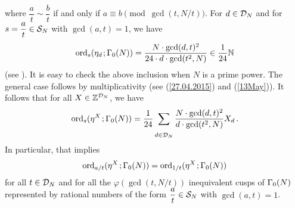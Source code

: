 \documentclass[a4paper,11pt]{amsart}
\begin{document}
where $\dfrac{a}{t}\sim\dfrac{b}{t}$ if and only if $a\equiv b\pmod{\gcd(t,N/t)}$.
For $d\in\mathcal{D}_N$ and for $s=\dfrac{a}t\in\mathcal{S}_N$ with $\gcd(a,t)=1$, we have
\begin{equation}
 \ord_s(\e_d\hspace{1pt};\GN)= \frac{N\cdot\gcd(d,t)^2}{24\cdot d\cdot\gcd(t^2,N)}\in\frac1{24}\N %
\label{26.04.2015}\end{equation}
(see %
\cite{ymart}). 
It is easy to check the above inclusion  %
when $N$ is a prime power. %
The general case %
follows by multiplicativity (see (\ref{27.04.2015}) and (\ref{13May})).
It follows that for all $X\in\mathbb{Z}^{\mathcal{D}_N}$, we have
\begin{equation}
  \operatorname{ord}_s(\eta^X\hspace{1pt};\Gamma_0(N))= \frac1{24}\sum_{\substack{\ \\\ \\d\in\mathcal{D}_N}}\frac{N\cdot\gcd(d,t)^2}{d\cdot\gcd(t^2,N)}X_d\hspace{1.5pt}. 
\label{27.04}\end{equation}
 In particular, %
that implies
\begin{equation}
 \operatorname{ord}_{a/t}(\eta^X\hspace{1pt};\Gamma_0(N))=\operatorname{ord}_{1/t}(\eta^X\hspace{1pt};\Gamma_0(N))
\label{27.04.2015.1}\end{equation}
for all $t\in\mathcal{D}_N$ and for all the $\varphi(\gcd(t,N/t))$ inequivalent cusps of $\Gamma_0(N)$
represented by rational numbers
of the form $\dfrac{a}{t}\in\mathcal{S}_N$ with $\gcd(a,t)=1$.
\end{document}
